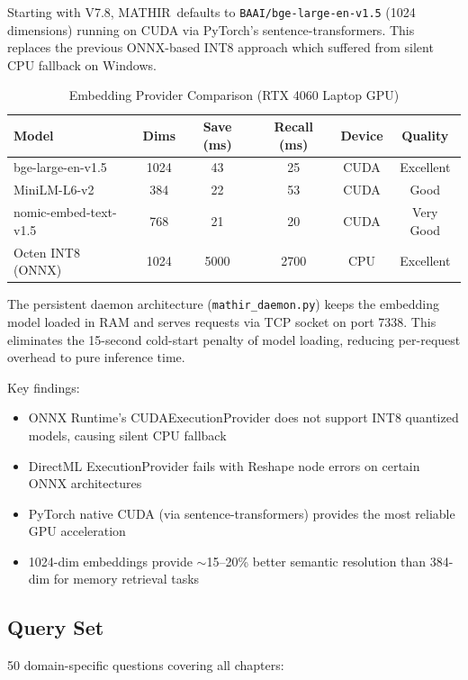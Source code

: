 \documentclass[12pt,a4paper]{article}
\theoremstyle{definition}
\theoremstyle{remark}
\newcommand{\MATHIR}{\textsc{MATHIR}}
\begin{document}
Starting with V7.8, \MATHIR\ defaults to \texttt{BAAI/bge-large-en-v1.5} (1024 dimensions) running on CUDA via PyTorch's sentence-transformers. This replaces the previous ONNX-based INT8 approach which suffered from silent CPU fallback on Windows.

\begin{table}[h]
\centering
\caption{Embedding Provider Comparison (RTX 4060 Laptop GPU)}
\label{tab:gpu-embedding}
\begin{tabular}{lccccc}
\toprule
\textbf{Model} & \textbf{Dims} & \textbf{Save (ms)} & \textbf{Recall (ms)} & \textbf{Device} & \textbf{Quality} \\
\midrule
bge-large-en-v1.5 & 1024 & 43 & 25 & CUDA & Excellent \\
MiniLM-L6-v2 & 384 & 22 & 53 & CUDA & Good \\
nomic-embed-text-v1.5 & 768 & 21 & 20 & CUDA & Very Good \\
Octen INT8 (ONNX) & 1024 & 5000 & 2700 & CPU & Excellent \\
\bottomrule
\end{tabular}
\end{table}

The persistent daemon architecture (\texttt{mathir\_daemon.py}) keeps the embedding model loaded in RAM and serves requests via TCP socket on port 7338. This eliminates the 15-second cold-start penalty of model loading, reducing per-request overhead to pure inference time.

Key findings:
\begin{itemize}
\item ONNX Runtime's CUDAExecutionProvider does not support INT8 quantized models, causing silent CPU fallback
\item DirectML ExecutionProvider fails with Reshape node errors on certain ONNX architectures  
\item PyTorch native CUDA (via sentence-transformers) provides the most reliable GPU acceleration
\item 1024-dim embeddings provide $\sim$15--20\% better semantic resolution than 384-dim for memory retrieval tasks
\end{itemize}

\subsection{Query Set}

50 domain-specific questions covering all chapters:
\end{document}
